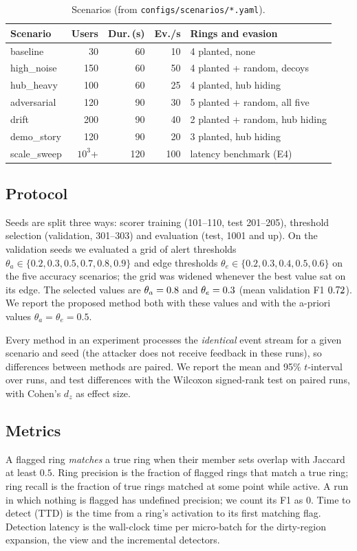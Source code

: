 \begin{table}[t]
\centering
\caption{Scenarios (from \texttt{configs/scenarios/*.yaml}).}
\label{tab:scenario-def}
\small
\setlength{\tabcolsep}{3pt}
\begin{tabular}{lrrrl}
\toprule
Scenario & Users & Dur.\,(s) & Ev./s & Rings and evasion \\
\midrule
baseline & 30 & 60 & 10 & 4 planted, none \\
high\_noise & 150 & 60 & 50 & 4 planted + random, decoys \\
hub\_heavy & 100 & 60 & 25 & 4 planted, hub hiding \\
adversarial & 120 & 90 & 30 & 5 planted + random, all five \\
drift & 200 & 90 & 40 & 2 planted + random, hub hiding \\
demo\_story & 120 & 90 & 20 & 3 planted, hub hiding \\
scale\_sweep & $10^3$+ & 120 & 100 & latency benchmark (E4) \\
\bottomrule
\end{tabular}
\end{table}

\subsection{Protocol}
\label{sec:protocol}
Seeds are split three ways: scorer training (101--110, test 201--205),
threshold selection (validation, 301--303) and evaluation (test, 1001 and up).
On the validation seeds we evaluated a grid of alert thresholds
$\theta_a\in\{0.2,0.3,0.5,0.7,0.8,0.9\}$ and edge thresholds
$\theta_e\in\{0.2,0.3,0.4,0.5,0.6\}$ on the five accuracy scenarios; the grid was
widened whenever the best value sat on its edge. The selected values are
$\theta_a=0.8$ and $\theta_e=0.3$ (mean validation F1
$0.72$). We report the proposed method both with these values and with
the a-priori values $\theta_a=\theta_e=0.5$.

Every method in an experiment processes the \emph{identical} event stream for a
given scenario and seed (the attacker does not receive feedback in these runs),
so differences between methods are paired. We report the mean and 95\%
$t$-interval over runs, and test differences with the Wilcoxon signed-rank test
on paired runs, with Cohen's $d_z$ as effect size.

\subsection{Metrics}
A flagged ring \emph{matches} a true ring when their member sets overlap with
Jaccard at least $0.5$. Ring precision is the fraction of flagged rings that
match a true ring; ring recall is the fraction of true rings matched at some
point while active. A run in which nothing is flagged has undefined precision;
we count its F1 as 0. Time to detect (TTD) is the time from a ring's
activation to its first matching flag. Detection latency is the wall-clock time
per micro-batch for the dirty-region expansion, the view and the incremental
detectors.

